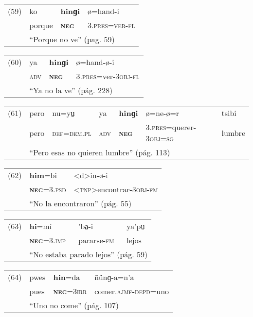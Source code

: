 {\setmainfont{Charis SIL} 

\begin{tabular}{llll}
(59) & ko & \textbf{hinɡi} & ø=hand-i \\
& porque & \textsc{\textbf{neg}} & \textsc{3.pres=ver-fl} \\
& \multicolumn{3}{l}{``Porque no ve'' (pag. 59)}
\end{tabular} \vspace{0.5cm}

\begin{tabular}{llll}
(60) & ya & \textbf{hinɡi} & ø=hand-ø-i \\
& \textsc{adv} & \textsc{\textbf{neg}} & \textsc{3.pres}=ver-\textsc{3obj-fl} \\
& \multicolumn{3}{l}{``Ya no la ve'' (pág. 228)}
\end{tabular} \vspace{0.5cm}

\begin{tabular}{lllllll}
(61) & pero & nu=yu̠ & ya & \textbf{hinɡi} & ø=ne-ø=r & tsibi \\
& pero & \textsc{def=dem.pl} & \textsc{adv} & \textsc{\textbf{neg}} & \textsc{3.pres}=querer-\textsc{3obj=sg} & lumbre \\
& \multicolumn{6}{l}{``Pero esas no quieren lumbre'' (pág. 113)}
\end{tabular} \vspace{0.5cm}

\begin{tabular}{lll}
(62) & \textbf{him}=bi & <d>in-ø-i \\
& \textsc{\textbf{neg}=3.psd} & <\textsc{tnp}>encontrar-\textsc{3obj-fm} \\
& \multicolumn{2}{l}{``No la encontraron'' (pág. 55)}
\end{tabular} \vspace{0.5cm}

\begin{tabular}{llll}
(63) & \textbf{hi}=mí & 'ba̠-i & ya'pu̠ \\
& \textsc{\textbf{neg}=3.imp} & pararse-\textsc{fm} & lejos \\
& \multicolumn{3}{l}{``No estaba parado lejos'' (pág. 59)}
\end{tabular} \vspace{0.5cm}

\begin{tabular}{llll}
(64) & pwes & \textbf{hin}=da & ñünɡ-a=n'a \\
& pues & \textsc{\textbf{neg}=3irr} & comer.\textsc{ajmf-depd}=uno\\
& \multicolumn{3}{l}{``Uno no come'' (pág. 107)}
\end{tabular} \vspace{0.5cm}

}

